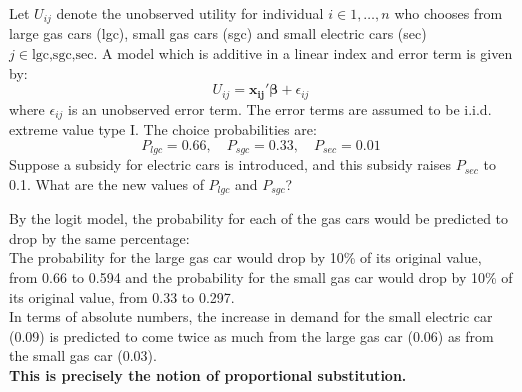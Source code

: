 \documentclass[DIV=14,titlepage=false]{scrreprt}
\begin{document}
\begin{question}
    Let $U_{ij}$ denote the unobserved utility for individual $i\in{1,\dots,n}$ who chooses from large gas cars (lgc), small gas cars (sgc) and small electric cars (sec) $j\in{\text{lgc,sgc,sec}}$. A model which is additive in a linear index and error term is given by:
    \[
        U_{ij} = \mathbf{x_{ij}'\beta} + \epsilon_{ij}
    \]
    where $\epsilon_{ij}$ is an unobserved error term. The error terms are assumed to be i.i.d. extreme value type I. The choice probabilities are:
    \[
        P_{lgc} = 0.66, \quad P_{sgc} = 0.33, \quad P_{sec} = 0.01
    \]
    Suppose a subsidy for electric cars is introduced, and this subsidy raises $P_{sec}$ to 0.1. What are the new values of $P_{lgc}$ and $P_{sgc}$?
\end{question}
\begin{solution}
By the logit model, the probability for each of the gas cars would be predicted to drop by the same percentage:\\
The probability for the large gas car would drop by 10\% of its original value, from 0.66 to 0.594 and the probability for the small gas car would drop by 10\% of its original value, from 0.33 to 0.297.\\
In terms of absolute numbers, the increase in demand for the small electric car (0.09) is predicted to come twice as much from the large gas car (0.06) as from the small gas car (0.03).\\
\textbf{This is precisely the notion of proportional substitution.}
\end{solution}
\end{document}
